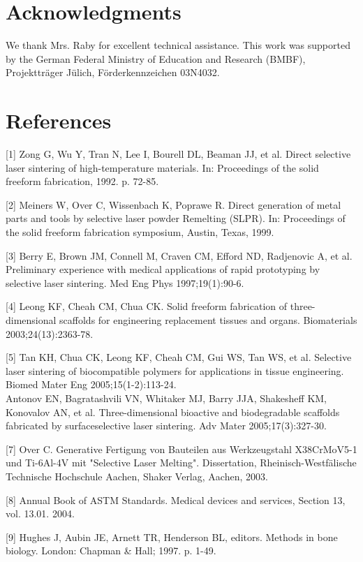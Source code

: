 \documentclass[10pt]{article}
\begin{document}
\section*{Acknowledgments}
We thank Mrs. Raby for excellent technical assistance. This work was supported by the German Federal Ministry of Education and Research (BMBF), Projektträger Jülich, Förderkennzeichen 03N4032.

\section*{References}
[1] Zong G, Wu Y, Tran N, Lee I, Bourell DL, Beaman JJ, et al. Direct selective laser sintering of high-temperature materials. In: Proceedings of the solid freeform fabrication, 1992. p. 72-85.

[2] Meiners W, Over C, Wissenbach K, Poprawe R. Direct generation of metal parts and tools by selective laser powder Remelting (SLPR). In: Proceedings of the solid freeform fabrication symposium, Austin, Texas, 1999.

[3] Berry E, Brown JM, Connell M, Craven CM, Efford ND, Radjenovic A, et al. Preliminary experience with medical applications of rapid prototyping by selective laser sintering. Med Eng Phys 1997;19(1):90-6.

[4] Leong KF, Cheah CM, Chua CK. Solid freeform fabrication of three-dimensional scaffolds for engineering replacement tissues and organs. Biomaterials 2003;24(13):2363-78.

[5] Tan KH, Chua CK, Leong KF, Cheah CM, Gui WS, Tan WS, et al. Selective laser sintering of biocompatible polymers for applications in tissue engineering. Biomed Mater Eng 2005;15(1-2):113-24.\\
[6] Antonov EN, Bagratashvili VN, Whitaker MJ, Barry JJA, Shakesheff KM, Konovalov AN, et al. Three-dimensional bioactive and biodegradable scaffolds fabricated by surfaceselective laser sintering. Adv Mater 2005;17(3):327-30.

[7] Over C. Generative Fertigung von Bauteilen aus Werkzeugstahl X38CrMoV5-1 und Ti-6Al-4V mit "Selective Laser Melting". Dissertation, Rheinisch-Westfälische Technische Hochschule Aachen, Shaker Verlag, Aachen, 2003.

[8] Annual Book of ASTM Standards. Medical devices and services, Section 13, vol. 13.01. 2004.

[9] Hughes J, Aubin JE, Arnett TR, Henderson BL, editors. Methods in bone biology. London: Chapman \& Hall; 1997. p. 1-49.
\end{document}
